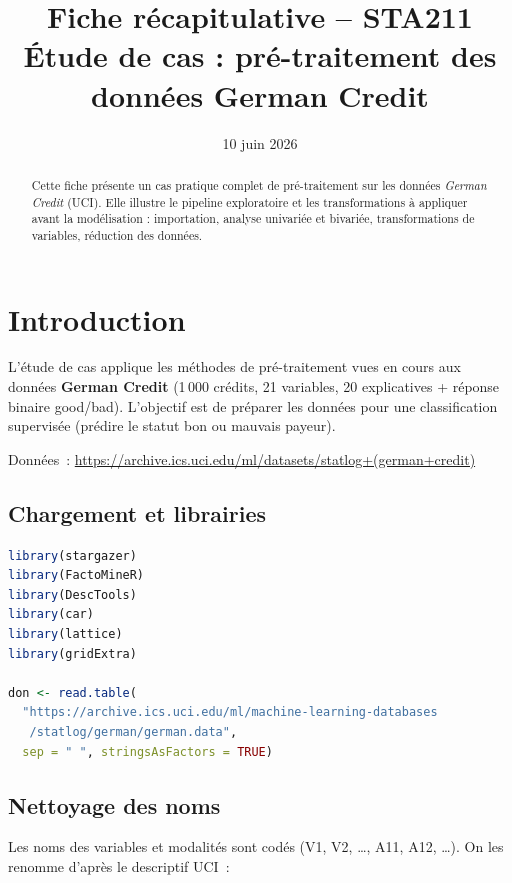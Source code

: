 \documentclass[a4paper,11pt]{article}
\title{\textbf{Fiche récapitulative -- STA211}\\[4pt]
\large Étude de cas : pré-traitement des données German Credit}
\author{}
\date{10 juin 2026}
\theoremstyle{definition}
\theoremstyle{remark}
\begin{document}
\maketitle
\thispagestyle{empty}

\begin{abstract}
Cette fiche présente un cas pratique complet de pré-traitement sur les
données \emph{German Credit} (UCI). Elle illustre le pipeline
exploratoire et les transformations à appliquer avant la modélisation :
importation, analyse univariée et bivariée, transformations de
variables, réduction des données.
\end{abstract}

\vfill
\tableofcontents
\newpage

\section{Introduction}

L'étude de cas applique les méthodes de pré-traitement vues en cours
aux données \textbf{German Credit} (1\,000 crédits, 21 variables, 20
explicatives + réponse binaire good/bad). L'objectif est de préparer
les données pour une classification supervisée (prédire le statut bon
ou mauvais payeur).

Données~: \url{https://archive.ics.uci.edu/ml/datasets/statlog+(german+credit)}

\subsection{Chargement et librairies}

\begin{lstlisting}[language=R]
library(stargazer)
library(FactoMineR)
library(DescTools)
library(car)
library(lattice)
library(gridExtra)

don <- read.table(
  "https://archive.ics.uci.edu/ml/machine-learning-databases
   /statlog/german/german.data",
  sep = " ", stringsAsFactors = TRUE)
\end{lstlisting}

\subsection{Nettoyage des noms}

Les noms des variables et modalités sont codés (V1, V2, \dots, A11,
A12, \dots). On les renomme d'après le descriptif UCI~:
\end{document}
